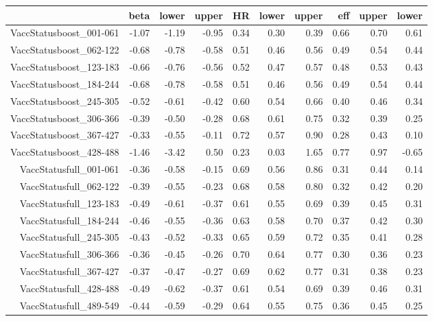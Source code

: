 \begin{table}[ht]
\centering
\begin{tabular}{rrrrrrrrrr}
  \hline
 & beta & lower & upper & HR & lower & upper & eff & upper & lower \\ 
  \hline
VaccStatusboost\_001-061 & -1.07 & -1.19 & -0.95 & 0.34 & 0.30 & 0.39 & 0.66 & 0.70 & 0.61 \\ 
  VaccStatusboost\_062-122 & -0.68 & -0.78 & -0.58 & 0.51 & 0.46 & 0.56 & 0.49 & 0.54 & 0.44 \\ 
  VaccStatusboost\_123-183 & -0.66 & -0.76 & -0.56 & 0.52 & 0.47 & 0.57 & 0.48 & 0.53 & 0.43 \\ 
  VaccStatusboost\_184-244 & -0.68 & -0.78 & -0.58 & 0.51 & 0.46 & 0.56 & 0.49 & 0.54 & 0.44 \\ 
  VaccStatusboost\_245-305 & -0.52 & -0.61 & -0.42 & 0.60 & 0.54 & 0.66 & 0.40 & 0.46 & 0.34 \\ 
  VaccStatusboost\_306-366 & -0.39 & -0.50 & -0.28 & 0.68 & 0.61 & 0.75 & 0.32 & 0.39 & 0.25 \\ 
  VaccStatusboost\_367-427 & -0.33 & -0.55 & -0.11 & 0.72 & 0.57 & 0.90 & 0.28 & 0.43 & 0.10 \\ 
  VaccStatusboost\_428-488 & -1.46 & -3.42 & 0.50 & 0.23 & 0.03 & 1.65 & 0.77 & 0.97 & -0.65 \\ 
  VaccStatusfull\_001-061 & -0.36 & -0.58 & -0.15 & 0.69 & 0.56 & 0.86 & 0.31 & 0.44 & 0.14 \\ 
  VaccStatusfull\_062-122 & -0.39 & -0.55 & -0.23 & 0.68 & 0.58 & 0.80 & 0.32 & 0.42 & 0.20 \\ 
  VaccStatusfull\_123-183 & -0.49 & -0.61 & -0.37 & 0.61 & 0.55 & 0.69 & 0.39 & 0.45 & 0.31 \\ 
  VaccStatusfull\_184-244 & -0.46 & -0.55 & -0.36 & 0.63 & 0.58 & 0.70 & 0.37 & 0.42 & 0.30 \\ 
  VaccStatusfull\_245-305 & -0.43 & -0.52 & -0.33 & 0.65 & 0.59 & 0.72 & 0.35 & 0.41 & 0.28 \\ 
  VaccStatusfull\_306-366 & -0.36 & -0.45 & -0.26 & 0.70 & 0.64 & 0.77 & 0.30 & 0.36 & 0.23 \\ 
  VaccStatusfull\_367-427 & -0.37 & -0.47 & -0.27 & 0.69 & 0.62 & 0.77 & 0.31 & 0.38 & 0.23 \\ 
  VaccStatusfull\_428-488 & -0.49 & -0.62 & -0.37 & 0.61 & 0.54 & 0.69 & 0.39 & 0.46 & 0.31 \\ 
  VaccStatusfull\_489-549 & -0.44 & -0.59 & -0.29 & 0.64 & 0.55 & 0.75 & 0.36 & 0.45 & 0.25 \\ 

\end{tabular}
\end{table}
